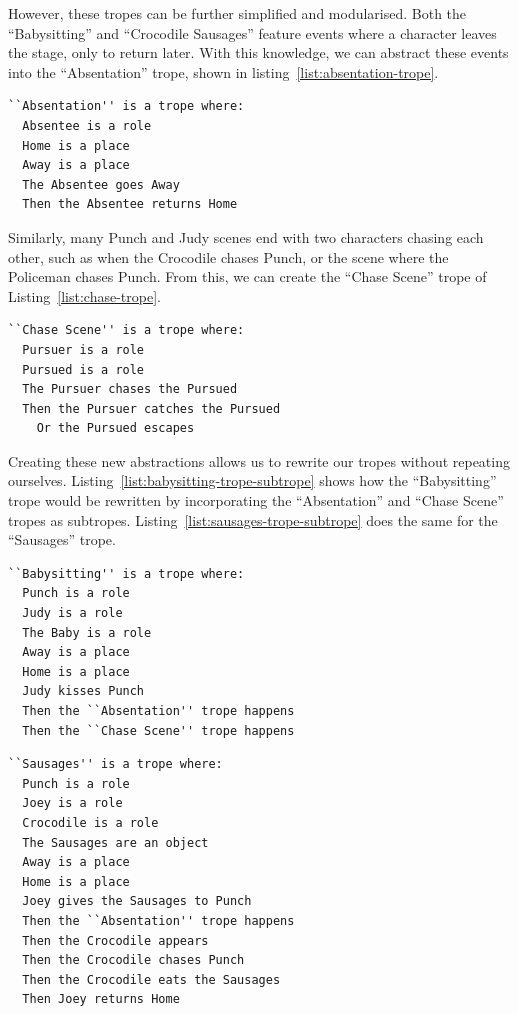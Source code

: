 \documentclass[11pt]{report}
\begin{document}
However, these tropes can be further simplified and modularised. Both the
``Babysitting'' and ``Crocodile Sausages'' feature events where a character
leaves the stage, only to return later. With this knowledge, we can abstract
these events into the ``Absentation'' trope, shown in
listing~\ref{list:absentation-trope}.

\begin{lstlisting}[label={list:absentation-trope},caption={An ``Absentation'' trope}]
``Absentation'' is a trope where:
  Absentee is a role
  Home is a place 
  Away is a place
  The Absentee goes Away
  Then the Absentee returns Home
\end{lstlisting}

Similarly, many Punch and Judy scenes end
with two characters chasing each other, such as when the Crocodile chases Punch,
or the scene where the Policeman chases Punch. From this, we can create the
``Chase Scene'' trope of Listing~\ref{list:chase-trope}.

\begin{lstlisting}[label={list:chase-trope},caption={A ``Chase Scene'' trope}]
``Chase Scene'' is a trope where:
  Pursuer is a role
  Pursued is a role
  The Pursuer chases the Pursued
  Then the Pursuer catches the Pursued
    Or the Pursued escapes
\end{lstlisting}

Creating these new abstractions allows us to rewrite our tropes without
repeating ourselves. Listing~\ref{list:babysitting-trope-subtrope} shows how the
``Babysitting'' trope would be rewritten by incorporating the ``Absentation''
and ``Chase Scene'' tropes as subtropes.
Listing~\ref{list:sausages-trope-subtrope} does the same for the ``Sausages'' trope.

\begin{lstlisting}[label={list:babysitting-trope-subtrope},caption={The ``Babysitting''
trope, redefined with a subtrope}]
``Babysitting'' is a trope where:
  Punch is a role
  Judy is a role
  The Baby is a role
  Away is a place
  Home is a place
  Judy kisses Punch
  Then the ``Absentation'' trope happens
  Then the ``Chase Scene'' trope happens
\end{lstlisting}

\begin{lstlisting}[label={list:sausages-trope-subtrope},caption={The ``Sausages''
trope, redefined with a subtrope}]
``Sausages'' is a trope where:
  Punch is a role
  Joey is a role
  Crocodile is a role
  The Sausages are an object
  Away is a place
  Home is a place
  Joey gives the Sausages to Punch
  Then the ``Absentation'' trope happens
  Then the Crocodile appears
  Then the Crocodile chases Punch
  Then the Crocodile eats the Sausages
  Then Joey returns Home
\end{lstlisting}
\end{document}
